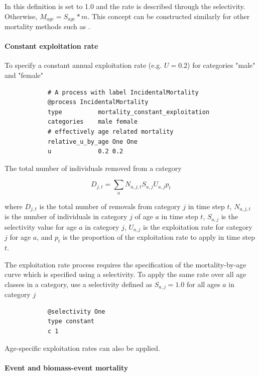 
In this definition  is set to 1.0 and the rate is described through the selectivity. Otherwise, $M_{age} = S_{age} * m$. This concept can be constructed similarly for other mortality methods such as .

\paragraph{Constant exploitation rate}\label{sec:Process-MortalityConstantExploitation} 

To specify a constant annual exploitation rate (e.g. $U=0.2$) for categories "male" and "female"

{\small{\begin{verbatim}
			# A process with label IncidentalMortality
			@process IncidentalMortality
			type          mortality_constant_exploitation
			categories    male female
			# effectively age related mortality
			relative_u_by_age One One
			u             0.2 0.2
\end{verbatim}}}

The total number of individuals removed from a category

\begin{equation}
	D_{j,t} = \sum_a N_{a,j,t} S_{a,j} U_{a,j} p_t
\end{equation}

where $D_{j,t}$ is the total number of removals from category $j$ in time step $t$, $N_{a,j,t}$ is the number of individuals in category $j$ of age $a$ in time step $t$, $S_{a,j}$ is the selectivity value for age $a$ in category $j$, $U_{a,j}$ is the exploitation rate for category $j$ for age $a$, and $p_t$ is the proportion of the exploitation rate to apply in time step $t$.

The exploitation rate process requires the specification of the mortality-by-age curve which is specified using a selectivity. To apply the same rate over all age classes in a category, use a selectivity defined as $S_{a,j}=1.0$ for all ages $a$ in category $j$

{\small{\begin{verbatim}
			@selectivity One
			type constant
			c 1
\end{verbatim}}}

Age-specific exploitation rates can also be applied.

\paragraph{Event and biomass-event mortality}\label{sec:Process-MortalityEvent}\label{sec:Process-MortalityEventBiomass} 

